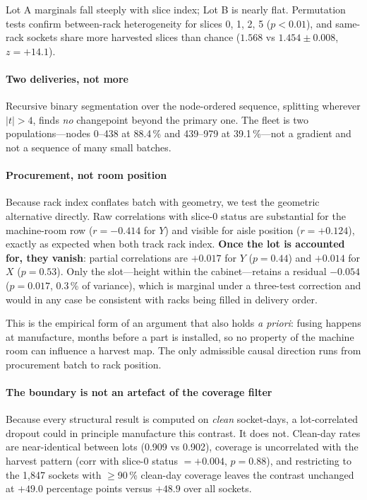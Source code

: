 \documentclass[10pt,conference]{IEEEtran}
\begin{document}
Lot A marginals fall steeply with slice index; Lot B is nearly flat. Permutation tests confirm
between-rack heterogeneity for slices 0, 1, 2, 5 ($p<0.01$), and same-rack sockets share more
harvested slices than chance ($1.568$ vs $1.454\pm0.008$, $z=+14.1$).

\paragraph*{Two deliveries, not more} Recursive binary segmentation over the node-ordered
sequence, splitting wherever $|t|>4$, finds \emph{no} changepoint beyond the primary one. The
fleet is two populations---nodes 0--438 at 88.4\,\% and 439--979 at 39.1\,\%---not a gradient and
not a sequence of many small batches.

\paragraph*{Procurement, not room position} \label{par:geom} Because rack index conflates batch
with geometry, we test the geometric alternative directly. Raw correlations with slice-0 status are
substantial for the machine-room row ($r=-0.414$ for $Y$) and visible for aisle position
($r=+0.124$), exactly as expected when both track rack index. \textbf{Once the lot is accounted
for, they vanish}: partial correlations are $+0.017$ for $Y$ ($p=0.44$) and $+0.014$ for $X$
($p=0.53$). Only the slot---height within the cabinet---retains a residual $-0.054$ ($p=0.017$,
0.3\,\% of variance), which is marginal under a three-test correction and would in any case be
consistent with racks being filled in delivery order.

This is the empirical form of an argument that also holds \emph{a priori}: fusing happens at
manufacture, months before a part is installed, so no property of the machine room can influence a
harvest map. The only admissible causal direction runs from procurement batch to rack position.

\paragraph*{The boundary is not an artefact of the coverage filter} Because every structural
result is computed on \emph{clean} socket-days, a lot-correlated dropout could in principle
manufacture this contrast. It does not. Clean-day rates are near-identical between lots (0.909 vs
0.902), coverage is uncorrelated with the harvest pattern (corr with slice-0 status $=+0.004$,
$p=0.88$), and restricting to the 1{,}847 sockets with $\ge$90\,\% clean-day coverage leaves the
contrast unchanged at $+49.0$ percentage points versus $+48.9$ over all sockets.
\end{document}
